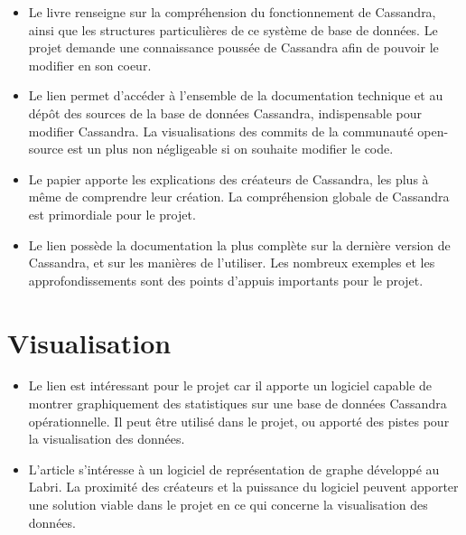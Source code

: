 \documentclass[12 pt]{article}
\begin{document}
\begin{itemize}
\item Le livre \cite{Hewitt2010} renseigne sur la compréhension du fonctionnement de Cassandra, ainsi que les structures particulières de ce système de base de données. Le projet demande une connaissance poussée de Cassandra afin de pouvoir le modifier en son coeur.

\item Le lien \cite{ApacheCassandra09} permet d'accéder à l'ensemble de la documentation technique et au dépôt des sources de la base de données Cassandra, indispensable pour modifier Cassandra. La visualisations des commits de la communauté open-source est un plus non négligeable si on souhaite modifier le code.

\item Le papier \cite{FacebookCassandra09} apporte les explications des créateurs de Cassandra, les plus à même de comprendre leur création. La compréhension globale de Cassandra est primordiale pour le projet.

\item Le lien \cite{DSDocCassandra15} possède la documentation la plus complète sur la dernière version de Cassandra, et sur les manières de l'utiliser. Les nombreux exemples et les approfondissements sont des points d'appuis importants pour le projet.

\end{itemize}

\section{Visualisation}

\begin{itemize}
\item Le lien \cite{DSOpsCenter14} est intéressant pour le projet car il apporte un logiciel capable de montrer graphiquement des statistiques sur une base de données Cassandra opérationnelle. Il peut être utilisé dans le projet, ou apporté des pistes pour la visualisation des données.

\item L'article \cite{Tulip12} s'intéresse à un logiciel de représentation de graphe développé au Labri. La proximité des créateurs et la puissance du logiciel peuvent apporter une solution viable dans le projet en ce qui concerne la visualisation des données.
\end{itemize} 


\end{document}

